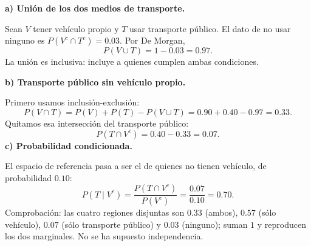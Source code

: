 \textbf{a) Unión de los dos medios de transporte.}\par\nopagebreak[4]
Sean $V$ tener vehículo propio y $T$ usar transporte público. El dato de no usar ninguno es $P(V^c\cap T^c)=0.03$. Por De Morgan,
\[
\boxed{P(V\cup T)=1-0.03=0.97.}
\]
La unión es inclusiva: incluye a quienes cumplen ambas condiciones.

\textbf{b) Transporte público sin vehículo propio.}\par\nopagebreak[4]
Primero usamos inclusión-exclusión:
\[
P(V\cap T)=P(V)+P(T)-P(V\cup T)=0.90+0.40-0.97=0.33.
\]
Quitamos esa intersección del transporte público:
\[
\boxed{P(T\cap V^c)=0.40-0.33=0.07.}
\]
\textbf{c) Probabilidad condicionada.}\par\nopagebreak[4]
El espacio de referencia pasa a ser el de quienes no tienen vehículo, de probabilidad $0.10$:
\[
\boxed{P(T\mid V^c)=\frac{P(T\cap V^c)}{P(V^c)}=\frac{0.07}{0.10}=0.70.}
\]
Comprobación: las cuatro regiones disjuntas son $0.33$ (ambos), $0.57$ (sólo vehículo), $0.07$ (sólo transporte público) y $0.03$ (ninguno); suman $1$ y reproducen los dos marginales. No se ha supuesto independencia.
